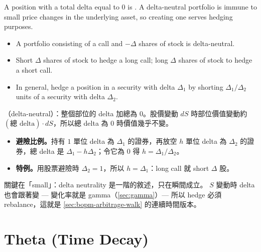 
A position with a total delta equal to $0$ is .
A delta-neutral portfolio is immune to small price changes in the underlying asset, so creating one serves hedging purposes.
\begin{itemize}[nosep]
	\item A portfolio consisting of a call and $-\Delta$ shares of stock is delta-neutral.
	\item Short $\Delta$ shares of stock to hedge a long call; long $\Delta$ shares of stock to hedge a short call.
	\item In general, hedge a position in a security with delta $\Delta_{1}$ by shorting $\Delta_{1}/\Delta_{2}$ units of a security with delta $\Delta_{2}$.
\end{itemize}

\suppstart
{}

\begin{remark}
	（delta-neutral）：整個部位的 delta 加總為 $0$。股價變動 $dS$ 時部位價值變動約 $(\text{總 delta})\cdot dS$，所以總 delta 為 $0$ 時價值幾乎不變。
	\begin{itemize}[nosep]
		\item \textbf{避險比例。}持有 $1$ 單位 delta 為 $\Delta_{1}$ 的證券，再放空 $h$ 單位 delta 為 $\Delta_{2}$ 的證券，總 delta 是 $\Delta_{1}-h\Delta_{2}$；令它為 $0$ 得 $h=\Delta_{1}/\Delta_{2}$。
		\item \textbf{特例。}用股票避險時 $\Delta_{2}=1$，所以 $h=\Delta_{1}$：long call 就 short $\Delta$ 股。
	\end{itemize}
\end{remark}

\begin{note}
	關鍵在「small」：delta neutrality 是一階的敘述，只在瞬間成立。
	$S$ 變動時 delta 也會跟著變 --- 變化率就是 gamma（\autoref{sec:gamma}）--- 所以 hedge 必須 rebalance，這就是 \autoref{sec:bopm-arbitrage-walk} 的連續時間版本。
\end{note}
\suppend

\section{Theta (Time Decay)}
\label{sec:theta}

